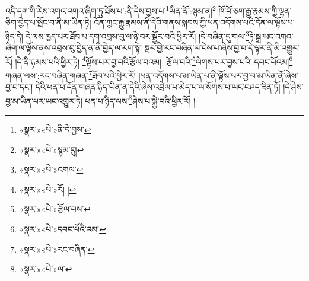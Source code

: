 འདི་དག་གི་རེས་འགའ་འགའ་ཞིག་ཏུ་ཐོས་པ་:ནི་དེས་བྱས་པ་\footnote{«སྣར་»«པེ་»ནི་དེ་བྱས་}ཡིན་ནོ་:སྙམ་ན།\footnote{«སྣར་»«པེ་»སྙམ་དུ།} ཁོ་བོ་ཅག་རྒྱུ་རྣམས་ཀྱི་ལྷན་ཅིག་བྱེད་པ་སྤོང་བ་ནི་མ་ཡིན་ཏེ། འོན་ཀྱང་རྒྱུ་རྣམས་ནི་དེའི་གནས་སྐབས་ཀྱི་ཕན་འདོགས་པའི་དོན་ལ་ལྟོས་པ་ཉིད་དེ། དེ་ལས་ཁྱད་པར་ཐོབ་པ་དག་འབྲས་བུ་ལ་ཉེ་བར་སྦྱོར་བའི་ཕྱིར་རོ། །དེ་བཞིན་དུ་གལ་\footnote{«སྣར་»«པེ་»འགལ་}ཏེ་སྒྲ་ཡང་འགའ་ཞིག་ལ་ལྟོས་ནས་འབྲས་བུ་བྱེད་ན་ནི་བྱེད་ལ་རག་སྟེ། སྔར་གྱི་རང་བཞིན་ལ་ངེས་པ་ཞེས་བྱ་བ་དེ་ལྟར་ནི་མི་འགྱུར་རོ། །དེ་ནི་ཉམས་པའི་ཕྱིར་ཏེ། \footnote{«སྣར་»«པེ་»རོ། ། }ལྟོས་པར་བྱ་བའི་རྩོལ་བའམ། :རྩོལ་བའི་\footnote{«སྣར་»«པེ་»རྩོལ་བས་}ལེགས་པར་བྱས་པའི་:དབང་པོའམ།\footnote{«སྣར་»«པེ་»དབང་པོའི་འམ།} གཞན་ལས་:རང་བཞིན་གཞན་\footnote{«སྣར་»«པེ་»རང་བཞིན་}ཐོབ་པའི་ཕྱིར་རོ། །ཕན་འདོགས་པ་མ་ཡིན་པ་ནི་ལྟོས་པར་བྱ་བ་མ་ཡིན་ནོ་ཞེས་བྱ་བ་དང་། དེའི་ཕན་པ་དོན་གཞན་ཉིད་ཡིན་ན་དེའི་ཞེས་འབྲེལ་པ་མེད་པ་ལ་སོགས་པ་ཡང་བཤད་ཟིན་ཏོ། །དེ་ཤེས་བྱ་མ་ཡིན་པར་ཡང་འགྱུར་ཏེ། ཕན་པ་ཉིད་ལས་\footnote{«སྣར་»«པེ་»ལ་}ཤེས་པ་སྐྱེ་བའི་ཕྱིར་རོ། །
